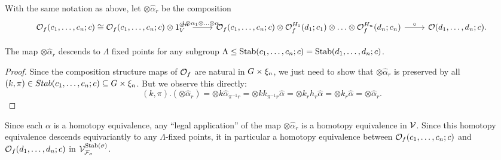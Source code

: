 \documentclass[psamsfonts,onesided,10pt,letterpaper]{amsart}%
\renewcommand{\F}{\mathcal F}
\renewcommand{\1}{\ensuremath{\mathbb{id}}}
\newcommand{\Vsigma}{\ensuremath{\V^{\Stab(\sigma)}_{\F_\sigma}}}
\begin{document}
With the same notation as above, let $\otimes \hat\alpha_r$ be the composition
\[
\begin{tikzcd}
  \O_f(c_1,\ldots, c_n;c) \cong \O_f(c_1,\ldots, c_n;c) \otimes 1_V^{\otimes n} \arrow[r, "1\otimes \alpha_1 \otimes\ldots\otimes\alpha_n"] & \O_f(c_1,\ldots,c_n;c) \otimes \O_f^{H_1}(d_1;c_1)\otimes\ldots\otimes\O_f^{H_n}(d_n;c_n) \arrow[r,"\circ"] & \O(d_1,\ldots,d_n;c).
\end{tikzcd}
\]

\begin{lemma}
  The map $\otimes\hat\alpha_r$ descends to $\Lambda$ fixed points for any subgroup $\Lambda\leq \mathrm{Stab}(c_1,\ldots, c_n;c) = \mathrm{Stab}(d_1,\ldots,d_n;c)$.
\end{lemma}
\begin{proof}
  Since the composition structure maps of $\mathcal{O}_f$ are natural in $G\times\xi_n$, we just need to show that $\otimes \hat\alpha_r$ is preserved by all $(k,\pi)\in Stab(c_1,\ldots, c_n;c)\subseteq G\times \xi_n$. But we observe this directly:
\[
(k,\pi).(\otimes \hat\alpha_r) = \otimes k\hat\alpha_{\pi^{-1}r} = \otimes k k_{\pi^{-1}r}\hat\alpha = \otimes k_r h_r\hat\alpha = \otimes k_r\hat\alpha = \otimes \hat\alpha_r.
\]
\end{proof}

Since each $\alpha$ is a homotopy equivalence, any ``legal application'' of the map $\otimes \hat\alpha_r$ is a homotopy equivalence in $\mathcal V$. Since this homotopy equivalence descends equivariantly to any $\Lambda$-fixed points, it in particular a homotopy equivalence between $\mathcal{O}_f(c_1,\ldots,c_n;c)$ and $\mathcal{O}_f(d_1,\ldots,d_n;c)$ in $\Vsigma$.
\end{document}
